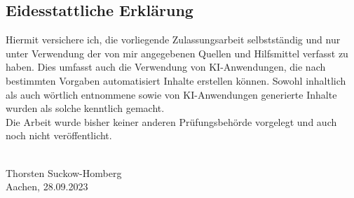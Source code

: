 \thispagestyle{empty}
\pagebreak
\hspace{0pt}
\vfill

\subsection*{Eidesstattliche Erklärung}
Hiermit versichere ich, die vorliegende Zulassungsarbeit selbstständig und nur unter
Verwendung der von mir angegebenen Quellen und Hilfsmittel verfasst zu haben.
Dies umfasst auch die Verwendung von KI-Anwendungen, die nach bestimmten Vorgaben
automatisiert Inhalte erstellen können.
Sowohl inhaltlich als auch wörtlich entnommene sowie
von KI-Anwendungen generierte Inhalte wurden als solche kenntlich gemacht.\\

Die Arbeit wurde bisher keiner anderen Prüfungsbehörde vorgelegt und auch noch nicht veröffentlicht.\\


\begin{center}
\underline{\hspace{6cm}}\\
Thorsten Suckow-Homberg \\Aachen, 28.09.2023
\end{center}


\vfill
\hspace{0pt}
\pagebreak

